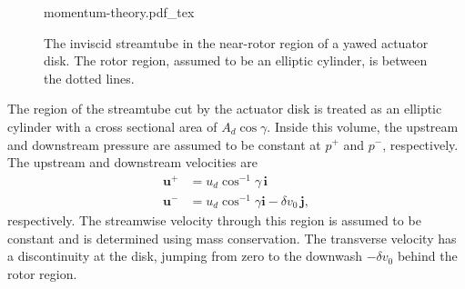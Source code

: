 \begin{figure}
\begin{center}
{momentum-theory.pdf_tex}
\caption{\label{fig:momentum-theory} The inviscid streamtube in the near-rotor region  of a yawed actuator disk. The rotor region, assumed to be an elliptic cylinder, is between the dotted lines.}
\end{center}
\end{figure}

The region of the streamtube cut by the actuator disk is treated as an elliptic cylinder with a cross sectional area of $A_d \cos \gamma$. Inside this volume, the upstream and downstream pressure are assumed to be constant at $p^+$ and $p^-$, respectively. The upstream and downstream  velocities are
\begin{align}
\mathbf{u}^+ &= u_d \cos^{-1}\gamma \, \boldsymbol{i} \\
\mathbf{u}^- &= u_d \cos^{-1}\gamma \boldsymbol{i} - \delta v_0 \, \boldsymbol{j},
\end{align}
respectively. The streamwise velocity through this region is assumed to be constant and is determined using mass conservation. The transverse velocity has a discontinuity at the disk, jumping from zero to the downwash $-\delta v_0$ behind the rotor region.

